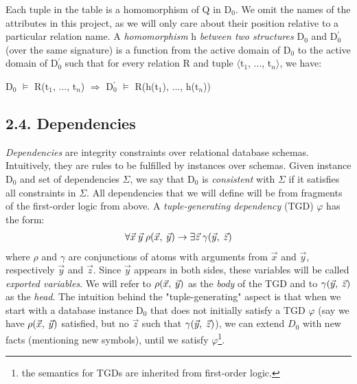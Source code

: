 \documentclass[11pt, a4paper, dvipsnames]{article}
\begin{document}
\noindent Each tuple in the table is a homomorphism of Q in D$_{0}$. We omit the names of the attributes in this project, as we will only care about their position relative to a particular relation name.\newline
A \textit{homomorphism} h \textit{between two structures} D$_{0}$ and D$^{'}_{0}$ (over the same signature) is a function from the active domain of D$_{0}$ to the active domain of D$^{'}_{0}$ such that for every relation R and tuple $\langle$t$_{1}$, ..., t$_{n}\rangle$, we have:
\begin{center}
D$_{0}$ $\vDash$ R(t$_{1}$, ..., t$_{n}$) $\Rightarrow$  D$^{'}_{0}$ $\vDash$ R(h(t$_{1}$), ..., h(t$_{n}$))
\end{center}

\subsection{2.4. Dependencies}
\textit{Dependencies} are integrity constraints over relational database schemas. Intuitively, they are rules to be fulfilled by instances over schemas. Given instance D$_{0}$ and set of dependencies $\Sigma$, we say that D$_{0}$ is \textit{consistent} with $\Sigma$ if it satisfies all constraints in $\Sigma$. All dependencies that we will define will be from fragments of the first-order logic from above.\newline
A \textit{tuple-generating dependency} (TGD) $\varphi$ has the form:
\begin{gather}
\forall \vec{x} \hspace{0.25em}\vec{y} \hspace{0.25em}\rho(\vec{x}, \hspace{0.25em}\vec{y}) \rightarrow \exists \vec{z} \hspace{0.25em}\gamma(\vec{y}, \hspace{0.25em}\vec{z})
\end{gather}
where $\rho$ and $\gamma$ are conjunctions of atoms with arguments from $\vec{x}$ and $\vec{y}$, respectively $\vec{y}$ and $\vec{z}$. Since $\vec{y}$ appears in both sides, these variables will be called \textit{exported variables}. We will refer to $\rho(\vec{x}, \hspace{0.25em} \vec{y})$ as the \textit{body} of the TGD and to $\gamma(\vec{y}, \hspace{0.25em}\vec{z})$ as the \textit{head}.\newline
The intuition behind the "tuple-generating" aspect is that when we start with a database instance D$_{0}$ that does not initially satisfy a TGD $\varphi$ (say we have $\rho(\vec{x}, \hspace{0.25em} \vec{y})$ satisfied, but no $\vec{z}$ such that $\gamma(\vec{y}, \hspace{0.25em}\vec{z})$), we can extend $D_{0}$ with new facts (mentioning new symbols), until we satisfy $\varphi$\footnote{the semantics for TGDs are inherited from first-order logic.}.\newline
\end{document}
